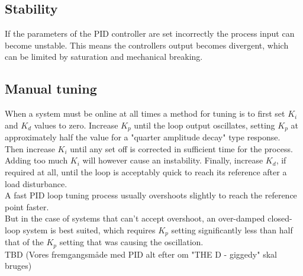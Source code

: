 \subsection {Stability} 

If the parameters of the PID controller are set incorrectly the process input can become unstable.
This means the controllers output becomes divergent, which can be limited by saturation and mechanical breaking. \\

\subsection {Manual tuning} 

When a system must be online at all times a method for tuning is to first set $K_i$ and $K_d$ values to zero. Increase $K_p$ until the loop output oscillates, setting $K_p$ at approximately half the value for a "quarter amplitude decay" type response.\\ 
Then increase $K_i$ until any set off is corrected in sufficient time for the process. Adding too much $K_i$ will however cause an instability. 
Finally, increase $K_d$, if required at all, until the loop is acceptably quick to reach its reference after a load disturbance.
\\ 
A fast PID loop tuning process usually overshoots slightly to reach the reference point faster.\\ 
But in the case of systems that can't accept overshoot, an over-damped closed-loop system is best suited, which requires $K_p$ setting significantly less than half that of the $K_p$ setting that was causing the oscillation.
\\

TBD (Vores fremgangsmåde med PID alt efter om "THE D - giggedy" skal bruges)

